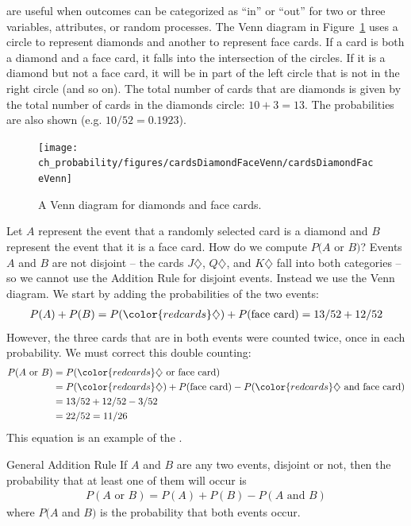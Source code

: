  are useful when outcomes can be categorized as ``in'' or ``out'' for two or three variables, attributes, or random processes. The Venn diagram in Figure~\ref{cardsDiamondFaceVenn} uses a circle to represent diamonds and another to represent face cards. If a card is both a diamond and a face card, it falls into the intersection of the circles. If it is a diamond but not a face card, it will be in part of the left circle that is not in the right circle (and so on). The total number of cards that are diamonds is given by the total number of cards in the diamonds circle: $10+3=13$. The probabilities are also shown (e.g. $10/52 = 0.1923$).

\begin{figure}
\centering
\texttt{[image: ch\_probability/figures/cardsDiamondFaceVenn/cardsDiamondFaceVenn]}
\caption{A Venn diagram for diamonds and face cards.}
\label{cardsDiamondFaceVenn}
\end{figure}

Let $A$ represent the event that a randomly selected card is a diamond and $B$ represent the event that it is a face card. How do we compute $P(A$ or $B)$? Events $A$ and $B$ are not disjoint -- the cards {\color{redcards}$J\diamondsuit$}, {\color{redcards}$Q\diamondsuit$}, and {\color{redcards}$K\diamondsuit$} fall into both categories -- so we cannot use the Addition Rule for disjoint events. Instead we use the Venn diagram. We start by adding the probabilities of the two events:
\begin{eqnarray*}
P(A) + P(B)
  = P({\color{redcards}\diamondsuit}) + P(\text{face card})
  = 13/52 + 12/52
\label{overCountFaceDiamond}
\end{eqnarray*}
However, the three cards that are in both events were counted twice, once in each probability. We must correct this double counting:
\begin{align*}
P(A\text{ or } B)
  &= P({\color{redcards}\diamondsuit}\text{ or face card}) \\
  &= P({\color{redcards}\diamondsuit}) + P(\text{face card})
      - P({\color{redcards}\diamondsuit}\text{ and face card}) \\
  &= 13/52 + 12/52 - 3/52 \\
  &= 22/52 = 11/26
\end{align*}
This equation is an example of the . 

\begin{onebox}{General Addition Rule}
  If $A$ and $B$ are any two events, disjoint or not, then
  the probability that at least one of them will occur is
  \begin{align*}
  P(A\text{ or }B) = P(A) + P(B) - P(A\text{ and }B)
  \end{align*}
  where $P(A$ and $B)$ is the probability that both events occur.
\end{onebox}

